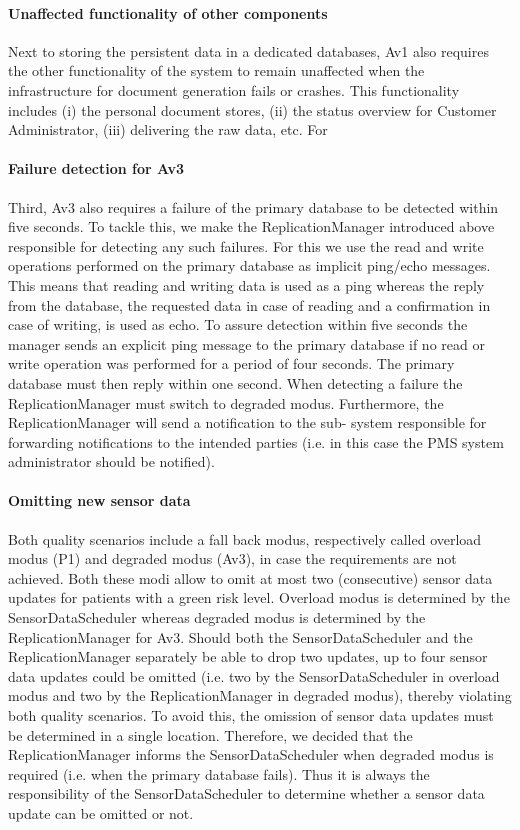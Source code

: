 \documentclass[a4paper,10pt]{article}
\begin{document}
\paragraph{Unaffected functionality of other components}
Next to storing the  persistent data in a dedicated databases, Av1 also requires the other functionality of the system to remain unaffected when the infrastructure for document generation fails or crashes. This functionality includes (i) the personal document stores, (ii) the status overview for Customer Administrator, (iii) delivering the raw data, etc.
For  

\paragraph{Failure detection for Av3}
Third, Av3 also requires a failure of the primary database to be detected within five seconds. To tackle this, we make the ReplicationManager introduced above responsible for detecting any such failures. For this we use the read and write operations performed on the primary database as implicit ping/echo messages. This means that reading and writing data is used as a ping whereas the reply from the database, the requested data in case of reading and a confirmation in case of writing, is used as echo. To assure detection within five seconds the manager sends an explicit ping message to the primary database if no read or write operation was performed for a period of four seconds. The primary database must then reply within one second. When detecting a failure the ReplicationManager must switch to degraded modus. Furthermore, the ReplicationManager will send a notification to the sub- system responsible for forwarding notifications to the intended parties (i.e. in this case the PMS system administrator should be notified).

\paragraph{Omitting new sensor data}
Both quality scenarios include a fall back modus, respectively called overload modus (P1) and degraded modus (Av3), in case the requirements are not achieved. Both these modi allow to omit at most two (consecutive) sensor data updates for patients with a green risk level. Overload modus is determined by the SensorDataScheduler whereas degraded modus is determined by the ReplicationManager for Av3. Should both the SensorDataScheduler and the ReplicationManager separately be able to drop two updates, up to four sensor data updates could be omitted (i.e. two by the SensorDataScheduler in overload modus and two by the ReplicationManager in degraded modus), thereby violating both quality scenarios. To avoid this, the omission of sensor data updates must be determined in a single location. Therefore, we decided that the ReplicationManager informs the SensorDataScheduler when degraded modus is required (i.e. when the primary database fails). Thus it is always the responsibility of the SensorDataScheduler to determine whether a sensor data update can be omitted or not.
\end{document}
